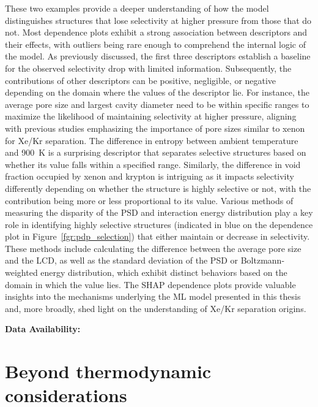 \documentclass[main]{subfiles}
\begin{document}
These two examples provide a deeper understanding of how the model distinguishes structures that lose selectivity at higher pressure from those that do not. Most dependence plots exhibit a strong association between descriptors and their effects, with outliers being rare enough to comprehend the internal logic of the model. As previously discussed, the first three descriptors establish a baseline for the observed selectivity drop with limited information. Subsequently, the contributions of other descriptors can be positive, negligible, or negative depending on the domain where the values of the descriptor lie. For instance, the average pore size and largest cavity diameter need to be within specific ranges to maximize the likelihood of maintaining selectivity at higher pressure, aligning with previous studies emphasizing the importance of pore sizes similar to xenon for Xe/Kr separation. The difference in entropy between ambient temperature and \SI{900}{\kelvin} is a surprising descriptor that separates selective structures based on whether its value falls within a specified range. Similarly, the difference in void fraction occupied by xenon and krypton is intriguing as it impacts selectivity differently depending on whether the structure is highly selective or not, with the contribution being more or less proportional to its value. Various methods of measuring the disparity of the PSD and interaction energy distribution play a key role in identifying highly selective structures (indicated in blue on the dependence plot in Figure~\ref{fgr:pdp_selection}) that either maintain or decrease in selectivity. These methods include calculating the difference between the average pore size and the LCD, as well as the standard deviation of the PSD or Boltzmann-weighted energy distribution, which exhibit distinct behaviors based on the domain in which the value lies. The SHAP dependence plots provide valuable insights into the mechanisms underlying the ML model presented in this thesis and, more broadly, shed light on the understanding of Xe/Kr separation origins.

\textbf{Data Availability:} \url{} 

\section{Beyond thermodynamic considerations}
\end{document}

